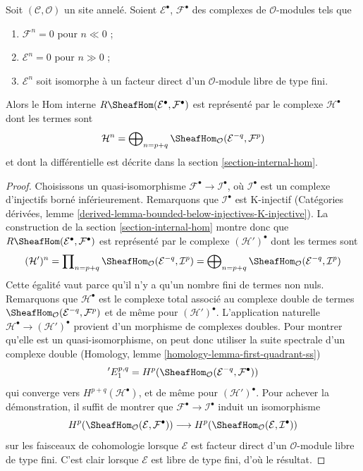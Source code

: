 \begin{lemma}
\label{lemma-Rhom-complex-of-direct-summands-finite-free}
Soit $(\mathcal{C}, \mathcal{O})$ un site annelé. Soient
$\mathcal{E}^\bullet$, $\mathcal{F}^\bullet$ des complexes de
$\mathcal{O}$-modules tels que
\begin{enumerate}
\item $\mathcal{F}^n = 0$ pour $n \ll 0$ ;
\item $\mathcal{E}^n = 0$ pour $n \gg 0$ ;
\item $\mathcal{E}^n$ soit isomorphe à un facteur direct d'un
$\mathcal{O}$-module libre de type fini.
\end{enumerate}
Alors le Hom interne
$R\SheafHom(\mathcal{E}^\bullet, \mathcal{F}^\bullet)$ est représenté par le
complexe $\mathcal{H}^\bullet$ dont les termes sont
$$
\mathcal{H}^n =
\bigoplus\nolimits_{n = p + q}
\SheafHom_\mathcal{O}(\mathcal{E}^{-q}, \mathcal{F}^p)
$$
et dont la différentielle est décrite dans la section
\ref{section-internal-hom}.
\end{lemma}

\begin{proof}
Choisissons un quasi-isomorphisme
$\mathcal{F}^\bullet \to \mathcal{I}^\bullet$, où $\mathcal{I}^\bullet$ est un
complexe d'injectifs borné inférieurement. Remarquons que
$\mathcal{I}^\bullet$ est K-injectif (Catégories dérivées, lemme
\ref{derived-lemma-bounded-below-injectives-K-injective}). La construction de
la section \ref{section-internal-hom} montre donc que
$R\SheafHom(\mathcal{E}^\bullet, \mathcal{F}^\bullet)$ est représenté par le
complexe $(\mathcal{H}')^\bullet$ dont les termes sont
$$
(\mathcal{H}')^n =
\prod\nolimits_{n = p + q}
\SheafHom_\mathcal{O}(\mathcal{E}^{-q}, \mathcal{I}^p) =
\bigoplus\nolimits_{n = p + q}
\SheafHom_\mathcal{O}(\mathcal{E}^{-q}, \mathcal{I}^p)
$$
Cette égalité vaut parce qu'il n'y a qu'un nombre fini de termes non nuls.
Remarquons que $\mathcal{H}^\bullet$ est le complexe total associé au complexe
double de termes
$\SheafHom_\mathcal{O}(\mathcal{E}^{-q}, \mathcal{F}^p)$
et de même pour $(\mathcal{H}')^\bullet$. L'application naturelle
$\mathcal{H}^\bullet \to (\mathcal{H}')^\bullet$ provient d'un morphisme de
complexes doubles. Pour montrer qu'elle est un quasi-isomorphisme, on peut
donc utiliser la suite spectrale d'un complexe double (Homology, lemme
\ref{homology-lemma-first-quadrant-ss})
$$
{}'E_1^{p, q} =
H^p(\SheafHom_\mathcal{O}(\mathcal{E}^{-q}, \mathcal{F}^\bullet))
$$
qui converge vers $H^{p + q}(\mathcal{H}^\bullet)$, et de même pour
$(\mathcal{H}')^\bullet$. Pour achever la démonstration, il suffit de montrer
que $\mathcal{F}^\bullet \to \mathcal{I}^\bullet$ induit un isomorphisme
$$
H^p(\SheafHom_\mathcal{O}(\mathcal{E}, \mathcal{F}^\bullet))
\longrightarrow
H^p(\SheafHom_\mathcal{O}(\mathcal{E}, \mathcal{I}^\bullet))
$$
sur les faisceaux de cohomologie lorsque $\mathcal{E}$ est facteur direct
d'un $\mathcal{O}$-module libre de type fini. C'est clair lorsque
$\mathcal{E}$ est libre de type fini, d'où le résultat.
\end{proof}









